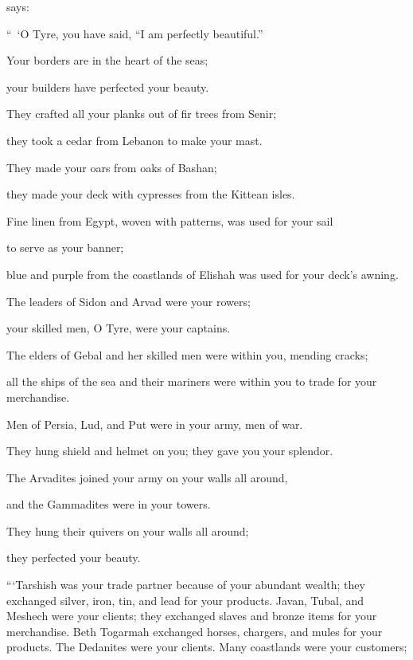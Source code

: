 {{}
says:
\par }{\Q “ ‘O
Tyre,
you
have said,
“I am
perfectly
beautiful.”
\par }{\Q Your borders
are in the heart
of the seas;
\par }{\Q your builders
have perfected
your beauty.
\par }{\Q {}They crafted
all
your planks
out of fir trees
from Senir;
\par }{\Q they took
a cedar
from Lebanon
to make
your mast.
\par }{\Q {}They made
your oars
from oaks
of Bashan;
\par }{\Q they made
your deck
with cypresses
from the Kittean
isles.
\par }{\Q {}Fine linen
from Egypt,
woven with patterns,
was used for
your sail
\par }{\Q to serve
as your banner;
\par }{\Q blue
and purple
from the coastlands
of Elishah
was used for
your deck’s awning.
\par }{\Q {}The leaders
of Sidon
and Arvad
were
your rowers;
\par }{\Q your skilled men,
O Tyre,
were
your captains.
\par }{\Q {}The elders
of Gebal
and her skilled men
were
within you, mending
cracks;
\par }{\Q all
the ships
of the sea
and their mariners
were
within you to trade for
your merchandise.
\par }{\Q {}Men of Persia,
Lud,
and Put
were
in your army,
men
of war.
\par }{\Q They hung
shield
and helmet
on you; they
gave
you your splendor.
\par }{\Q {}The Arvadites
joined your army
on
your walls
all around,
\par }{\Q and the Gammadites
were in your towers.
\par }{\Q They hung
their quivers
on
your walls
all around;
\par }{\Q they
perfected
your beauty.
\par }{\PP {}“‘Tarshish
was your trade
partner because of your abundant
wealth;
they exchanged silver,
iron,
tin,
and lead
for your products.
Javan,
Tubal,
and Meshech
were your clients;
they exchanged
slaves
and bronze
items
for your merchandise.
Beth
Togarmah
exchanged horses,
chargers,
and mules
for your products.
The Dedanites
were your clients.
Many
coastlands
were your customers;
}

